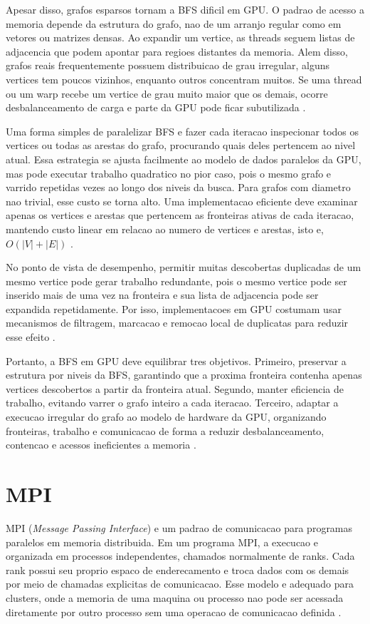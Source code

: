 \documentclass{article}
\begin{document}
Apesar disso, grafos esparsos tornam a BFS dificil em GPU. O padrao de acesso a
memoria depende da estrutura do grafo, nao de um arranjo regular como em vetores
ou matrizes densas. Ao expandir um vertice, as threads seguem listas de
adjacencia que podem apontar para regioes distantes da memoria. Alem disso, grafos
reais frequentemente possuem distribuicao de grau irregular, alguns vertices tem
poucos vizinhos, enquanto outros concentram muitos. Se uma thread ou um warp recebe 
um vertice de grau muito maior que os demais, ocorre desbalanceamento de carga e 
parte da GPU pode ficar subutilizada \cite{merrillgpu}.

Uma forma simples de paralelizar BFS e fazer cada iteracao inspecionar todos os 
vertices ou todas as arestas do grafo, procurando quais deles pertencem ao nivel atual. 
Essa estrategia se ajusta facilmente ao modelo de dados paralelos da GPU, mas pode
executar trabalho quadratico no pior caso, pois o mesmo grafo e varrido repetidas
vezes ao longo dos niveis da busca. Para grafos com diametro nao trivial, esse
custo se torna alto. Uma implementacao eficiente deve examinar apenas os vertices
e arestas que pertencem as fronteiras ativas de cada iteracao, mantendo custo
linear em relacao ao numero de vertices e arestas, isto e, $O(|V| + |E|)$
\cite{merrillgpu}.

No ponto de vista de desempenho, permitir muitas descobertas duplicadas de um mesmo 
vertice pode gerar trabalho redundante, pois o mesmo vertice pode ser inserido mais 
de uma vez na fronteira e sua lista de adjacencia pode ser expandida repetidamente. 
Por isso, implementacoes em GPU costumam usar mecanismos de filtragem, marcacao e 
remocao local de duplicatas para reduzir esse efeito \cite{merrillgpu}.

Portanto, a BFS em GPU deve equilibrar tres objetivos. Primeiro, preservar a
estrutura por niveis da BFS, garantindo que a proxima fronteira contenha apenas
vertices descobertos a partir da fronteira atual. Segundo, manter eficiencia de
trabalho, evitando varrer o grafo inteiro a cada iteracao. Terceiro, adaptar a
execucao irregular do grafo ao modelo de hardware da GPU, organizando fronteiras,
trabalho e comunicacao de forma a reduzir desbalanceamento, contencao e acessos
ineficientes a memoria
\cite{merrillgpu}.

\section{MPI}
MPI (\textit{Message Passing Interface}) e um padrao de comunicacao para
programas paralelos em memoria distribuida. Em um programa MPI, a execucao e
organizada em processos independentes, chamados normalmente de ranks. Cada rank
possui seu proprio espaco de enderecamento e troca dados com os demais por meio
de chamadas explicitas de comunicacao. Esse modelo e adequado para clusters,
onde a memoria de uma maquina ou processo nao pode ser acessada diretamente por
outro processo sem uma operacao de comunicacao definida \cite{mpistandard}.
\end{document}
